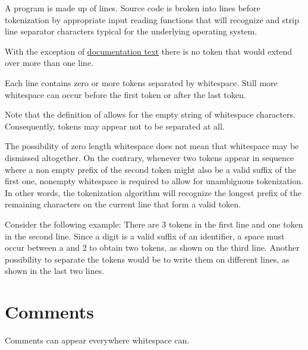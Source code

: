 A program is made up of lines.
Source code is broken into lines before tokenization by appropriate
input reading functions that will recognize and strip line separator
characters typical for the underlying operating system. 

With the exception of \hyperref[doccomment]{documentation text} there is no token that would
extend over more than one line.

Each line contains zero or more tokens separated by whitespace. Still
more whitespace can occur before the first token or after the last
token.

Note that the definition of  allows for the empty
string of whitespace characters. Consequently, tokens may appear not to
be separated at all.

The possibility of zero length whitespace does not mean that whitespace
may be dismissed altogether. On the contrary, whenever two tokens appear
in sequence where a non empty prefix of the second token might also be a
valid suffix of the first one, nonempty whitespace is required to allow
for unambiguous tokenization. In other words, the tokenization algorithm
will recognize the longest prefix of the remaining characters on the
current line that form a valid token.

Consider the following example:
There are 3 tokens in the first line and one token in the second line.
Since a digit is a valid suffix of an identifier, a space must occur
between a and 2 to obtain two tokens, as shown on the third line.
Another possibility to separate the tokens would be to write them on
different lines, as shown in the last two lines.

\section{Comments} 

Comments can appear everywhere whitespace can.

\begin{flushleft}
  \oder{} \\
  \\
 \regex{$\backslash$*/}\\
  
\end{flushleft}

